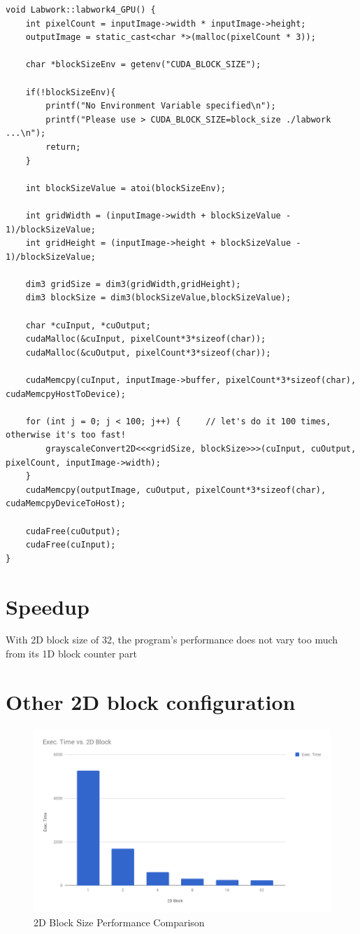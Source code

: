 \documentclass[a4paper,11pt, notitlepage]{article}
\begin{document}
\begin{flushleft}
\footnotesize
\begin{BVerbatim}
void Labwork::labwork4_GPU() {
    int pixelCount = inputImage->width * inputImage->height;
    outputImage = static_cast<char *>(malloc(pixelCount * 3)); 

    char *blockSizeEnv = getenv("CUDA_BLOCK_SIZE");

    if(!blockSizeEnv){
        printf("No Environment Variable specified\n");
        printf("Please use > CUDA_BLOCK_SIZE=block_size ./labwork ...\n");
        return;
    }

    int blockSizeValue = atoi(blockSizeEnv);
    
    int gridWidth = (inputImage->width + blockSizeValue - 1)/blockSizeValue;
    int gridHeight = (inputImage->height + blockSizeValue - 1)/blockSizeValue;

    dim3 gridSize = dim3(gridWidth,gridHeight);
    dim3 blockSize = dim3(blockSizeValue,blockSizeValue);

    char *cuInput, *cuOutput;
    cudaMalloc(&cuInput, pixelCount*3*sizeof(char));
    cudaMalloc(&cuOutput, pixelCount*3*sizeof(char));
    
    cudaMemcpy(cuInput, inputImage->buffer, pixelCount*3*sizeof(char), cudaMemcpyHostToDevice);
    
    for (int j = 0; j < 100; j++) {     // let's do it 100 times, otherwise it's too fast!
        grayscaleConvert2D<<<gridSize, blockSize>>>(cuInput, cuOutput, pixelCount, inputImage->width);
    }
    cudaMemcpy(outputImage, cuOutput, pixelCount*3*sizeof(char), cudaMemcpyDeviceToHost);
    
    cudaFree(cuOutput);
    cudaFree(cuInput);   
}
\end{BVerbatim}
\end{flushleft}

\section{Speedup}
With 2D block size of 32, the program's performance does not vary too much from its 1D block counter part

\section{Other 2D block configuration}
\begin{figure}[H]
\includegraphics[width=15cm]{chart-2d.png}
\centering
\caption{2D Block Size Performance Comparison}
\end{figure}
~\\
\end{document}
